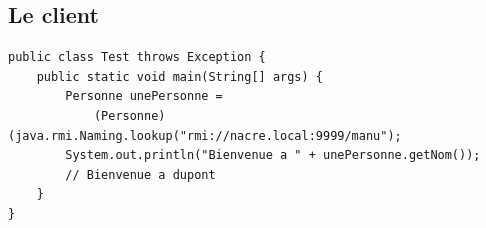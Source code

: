 \documentclass[a4paper,11pt]{report}
\begin{document}
\newpage

\subsection{Le client}
\begin{lstlisting}
public class Test throws Exception {
	public static void main(String[] args) {
		Personne unePersonne =
			(Personne)(java.rmi.Naming.lookup("rmi://nacre.local:9999/manu");
		System.out.println("Bienvenue a " + unePersonne.getNom());
		// Bienvenue a dupont
	}
}
\end{lstlisting}
\end{document}
